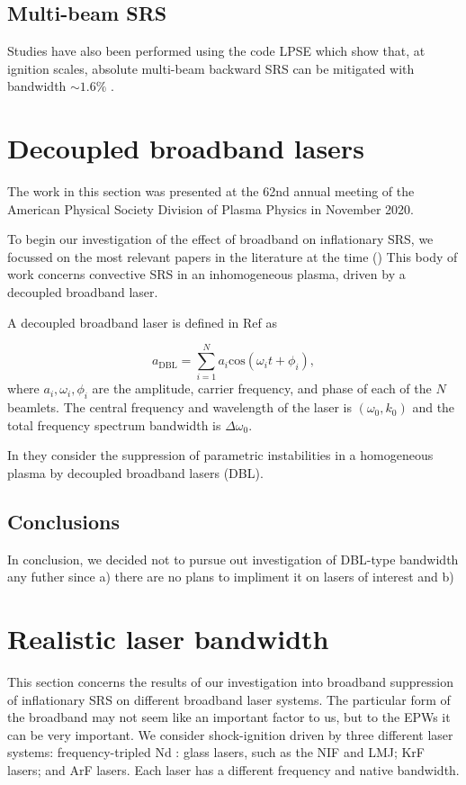 \subsection{Multi-beam SRS}
Studies have also been performed using the code LPSE which show that, at ignition scales, absolute multi-beam backward SRS can be mitigated with bandwidth $\sim 1.6\%$ \citep{Follett2021}.

\section{Decoupled broadband lasers}

The work in this section was presented at the 62nd annual meeting of the American Physical Society Division of Plasma Physics in November 2020.
 
To begin our investigation of the effect of broadband on inflationary SRS, we focussed on the most relevant papers in the literature at the time (\citep{Zhao2019}) This body of work concerns convective SRS in an inhomogeneous plasma, driven by a decoupled broadband laser.


A decoupled broadband laser is defined in Ref \cite{Zhao2017July} as

\begin{equation}\label{eqn:DBL}
  a_{\mathrm{DBL}} = \sum_{i=1}^{N} a_i \mathrm{cos}(\omega_it + \phi_i),
\end{equation}
where $a_i,\omega_i,\phi_i$ are the amplitude, carrier frequency, and phase of
each of the $N$ beamlets. The central frequency and wavelength of the laser is
$(\omega_0,k_0)$ and the total frequency spectrum bandwidth is
$\Delta\omega_0$.

In \cite{Zhao2019} they consider the suppression of parametric
instabilities in a homogeneous plasma by decoupled broadband lasers
(\acrshort{DBL}). 

\subsection{Conclusions}
In conclusion, we decided not to pursue out investigation of DBL-type bandwidth any futher since a) there are no plans to impliment it on lasers of interest and b) 


\section{Realistic laser bandwidth}\label{sec:params}

This section concerns the results of our investigation into broadband suppression of inflationary SRS on different broadband laser systems. The particular form of the broadband may not seem like an important factor to us, but to the EPWs it can be very important.
We consider shock-ignition driven by three different laser systems: frequency-tripled Nd : glass lasers, such as the NIF and LMJ; KrF lasers; and ArF lasers. Each laser has a different frequency and native bandwidth. 

